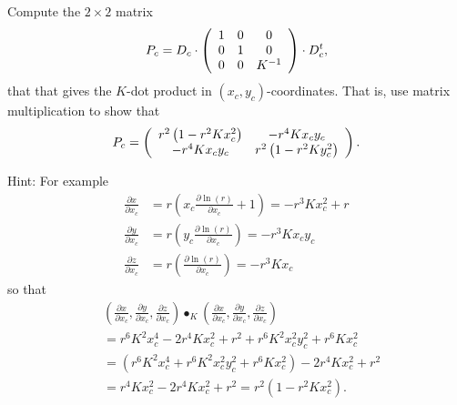 \documentclass{ximera}
\begin{document}
\begin{exercise}
\label{32}Compute the $2\times2$ matrix%
\[
P_{c}=D_{c}\cdot\left(
\begin{array}
[c]{ccc}%
1 & 0 & 0\\
0 & 1 & 0\\
0 & 0 & K^{-1}%
\end{array}
\right)  \cdot D_{c}^{t},
\]
that that gives the $K$-dot product in $\left(  x_{c},y_{c}\right)
$-coordinates. That is, use matrix multiplication to show that%
\[
P_{c}=\left(
\begin{array}
[c]{cc}%
r^{2}\left(  1-r^{2}Kx_{c}^{2}\right)  & -r^{4}Kx_{c}y_{c}\\
-r^{4}Kx_{c}y_{c} & r^{2}\left(  1-r^{2}Ky_{c}^{2}\right)
\end{array}
\right)  .
\]


Hint: For example%
\begin{align*}
\frac{\partial x}{\partial x_{c}}  &  =r\left(  x_{c}\frac{\partial \ln\left(
r\right)  }{\partial x_{c}}+1\right)  =-r^{3}Kx_{c}^{2}+r\\
\frac{\partial y}{\partial x_{c}}  &  =r\left(  y_{c}\frac{\partial \ln\left(
r\right)  }{\partial x_{c}}\right)  =-r^{3}Kx_{c}y_{c}\\
\frac{\partial z}{\partial x_{c}}  &  =r\left(  \frac{\partial \ln\left(
r\right)  }{\partial x_{c}}\right)  =-r^{3}Kx_{c}%
\end{align*}
so that%
\begin{align*}
&  \left(  \frac{\partial x}{\partial x_{c}},\frac{\partial y}{\partial x_{c}%
},\frac{\partial z}{\partial x_{c}}\right)  \bullet_{K}\left(  \frac{\partial
x}{\partial x_{c}},\frac{\partial y}{\partial x_{c}},\frac{\partial
z}{\partial x_{c}}\right) \\
&  =r^{6}K^{2}x_{c}^{4}-2r^{4}Kx_{c}^{2}+r^{2}+r^{6}K^{2}x_{c}^{2}y_{c}%
^{2}+r^{6}Kx_{c}^{2}\\
&  =\left(  r^{6}K^{2}x_{c}^{4}+r^{6}K^{2}x_{c}^{2}y_{c}^{2}+r^{6}Kx_{c}%
^{2}\right)  -2r^{4}Kx_{c}^{2}+r^{2}\\
&  =r^{4}Kx_{c}^{2}-2r^{4}Kx_{c}^{2}+r^{2}=r^{2}\left(  1-r^{2}Kx_{c}%
^{2}\right)  .
\end{align*}

\end{exercise}
\end{document}
